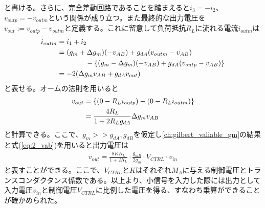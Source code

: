             と書ける。さらに、完全差動回路であることを踏まえると$i_{3}=-i_{2}$、$v_{outp}=-v_{outm}$という関係が成り立つ。また最終的な出力電圧を$v_{out}:=v_{outp}-v_{outm}$と定義する。これに留意して負荷抵抗$R_{L}$に流れる電流$i_{outm}$は
            \begin{align}
                i_{outm}&=i_{1}+i_{2}       \notag\\
                &=(g_{m}+\Delta g_{m})(-v_{AB})+g_{dA}(v_{outm}-v_{AB})       \notag\\
                &\quad\quad\quad\quad -\left\{  (g_{m}-\Delta g_{m})(-v_{AB})+g_{dA}(v_{outp}-v_{AB})  \right\}   \notag\\
                &=-2(\Delta g_{m}v_{AB}+g_{dA}v_{out})      \label{eq:2_iout}
            \end{align}
            と表せる。オームの法則を用いると
            \begin{align}
                v_{out}&=\left\{ \left(0-R_{L}i_{outp}\right) - \left(0-R_{L}i_{outm}\right) \right\}    \notag\\
                &=\frac{ 4R_{L} }{1+2R_{L}g_{dA}}\Delta g_{m}v_{AB}     \notag
            \end{align}
            と計算できる。ここで、$g_{m}>>g_{dA},g_{dB}$を仮定し\ref{ch:gilbert_valiable_gm}の結果と式(\ref{eq:2_vab})を用いると出力電圧は
            \begin{align}
                v_{out}=\frac{ 8KR_{L} }{ 1+2R_{L} }\cdot\frac{ g_{mB} }{ 2g_{m} }\cdot V_{CTRL}\cdot v_{in}       \label{eq:2_vout}
            \end{align}
            と表すことができる。ここで、$V_{CTRL}$と$K$はそれぞれ$M_{A}$に与える制御電圧とトランスコンダクタンス係数である。以上より、小信号を入力した際には出力として入力電圧$v_{in}$と制御電圧$V_{CTRL}$に比例した電圧を得る、すなわち乗算ができることが確かめられた。
            \newpage


